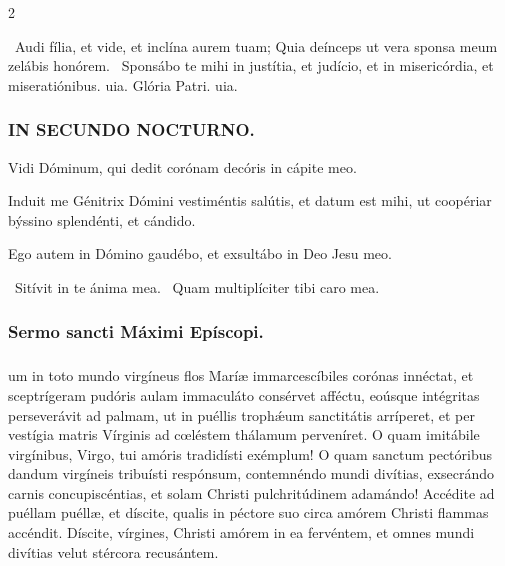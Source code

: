 \documentclass[9pt,twoside]{extarticle}
\begin{document}
\begin{multicols}{2}
{{{\begin{tightlist}{}
\item {}~Audi fília, et vide, et inclína aurem tuam; \textred{*} Quia deínceps ut vera sponsa meum zelábis honórem. ~Sponsábo te mihi in justítia, et judício, et in misericórdia, et miseratiónibus. uia. Glória Patri. uia.
\end{tightlist}

\subsubsection*{\center \textsc{IN SECUNDO NOCTURNO.}}
\begin{tightlist}{}
\item {} Vidi Dóminum, qui dedit corónam decóris in cápite meo.
\item {} Induit me Génitrix Dómini vestiméntis salútis, et datum est mihi, ut coopériar býssino splendénti, et cándido.
\item {} Ego autem in Dómino gaudébo, et exsultábo in Deo Jesu meo.
\item {}~Sitívit in te ánima mea. ~Quam multiplíciter tibi caro mea.
\end{tightlist}

\subsubsection*{\center Sermo sancti Máximi Epíscopi.}
\subsubsection*{\center {}}
um in toto mundo virgíneus flos Maríæ immarcescíbiles corónas innéctat, et sceptrígeram pudóris aulam immaculáto consérvet afféctu, eoúsque intégritas perseverávit ad palmam, ut in puéllis trophǽum sanctitátis arríperet, et per vestígia matris Vírginis ad cœléstem thálamum perveníret. O quam imitábile virgínibus, Virgo, tui amóris tradidísti exémplum! O quam sanctum pectóribus dandum virgíneis tribuísti respónsum, contemnéndo mundi divítias, exsecrándo carnis concupiscéntias, et solam Christi pulchritúdinem adamándo! Accédite ad puéllam puéllæ, et díscite, qualis in péctore suo circa amórem Christi flammas accéndit. Díscite, vírgines, Christi amórem in ea fervéntem, et omnes mundi divítias velut stércora recusántem.

}}}
\end{multicols}
\end{document}
